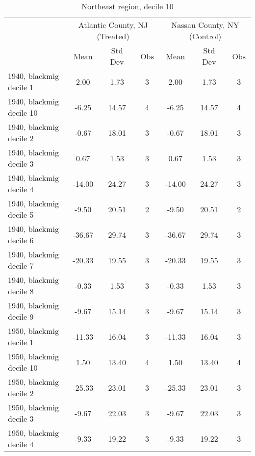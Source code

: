 \begin{table}[htbp]\centering
\def\sym#1{\ifmmode^{#1}\else\(^{#1}\)\fi}
\caption{Northeast region, decile 10 \label{tab1}}
\begin{tabular}{l*{2}{ccc}}
\toprule
                    &\multicolumn{3}{c}{Atlantic County, NJ (Treated)}&\multicolumn{3}{c}{Nassau County, NY (Control)}\\
                    &        Mean&     Std Dev&         Obs&        Mean&     Std Dev&         Obs\\
\midrule
1940, blackmig decile 1&        2.00&        1.73&           3&        2.00&        1.73&           3\\
1940, blackmig decile 10&       -6.25&       14.57&           4&       -6.25&       14.57&           4\\
1940, blackmig decile 2&       -0.67&       18.01&           3&       -0.67&       18.01&           3\\
1940, blackmig decile 3&        0.67&        1.53&           3&        0.67&        1.53&           3\\
1940, blackmig decile 4&      -14.00&       24.27&           3&      -14.00&       24.27&           3\\
1940, blackmig decile 5&       -9.50&       20.51&           2&       -9.50&       20.51&           2\\
1940, blackmig decile 6&      -36.67&       29.74&           3&      -36.67&       29.74&           3\\
1940, blackmig decile 7&      -20.33&       19.55&           3&      -20.33&       19.55&           3\\
1940, blackmig decile 8&       -0.33&        1.53&           3&       -0.33&        1.53&           3\\
1940, blackmig decile 9&       -9.67&       15.14&           3&       -9.67&       15.14&           3\\
1950, blackmig decile 1&      -11.33&       16.04&           3&      -11.33&       16.04&           3\\
1950, blackmig decile 10&        1.50&       13.40&           4&        1.50&       13.40&           4\\
1950, blackmig decile 2&      -25.33&       23.01&           3&      -25.33&       23.01&           3\\
1950, blackmig decile 3&       -9.67&       22.03&           3&       -9.67&       22.03&           3\\
1950, blackmig decile 4&       -9.33&       19.22&           3&       -9.33&       19.22&           3\\

\end{tabular}
\end{table}
